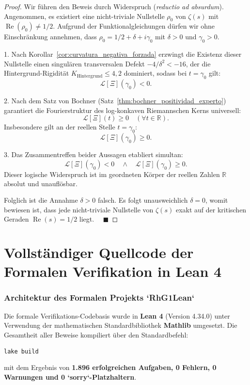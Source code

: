 \documentclass[11pt,a4paper]{article}
\theoremstyle{definition}
\theoremstyle{remark}
\begin{document}
\begin{proof}
Wir führen den Beweis durch Widerspruch (\textit{reductio ad absurdum}).
Angenommen, es existiert eine nicht-triviale Nullstelle $\rho_0$ von $\zeta(s)$ mit $\operatorname{Re}(\rho_0) \neq 1/2$.
Aufgrund der Funktionalgleichungen dürfen wir ohne Einschränkung annehmen, dass $\rho_0 = 1/2 + \delta + i\gamma_0$ mit $\delta > 0$ und $\gamma_0 > 0$.

1. Nach Korollar~\ref{cor:curvatura_negativa_forzada} erzwingt die Existenz dieser Nullstelle einen singulären transversalen Defekt $-4/\delta^2 < -16$, der die Hintergrund-Rigidität $K_{\mathrm{Hintergrund}} \le 4{,}2$ dominiert, sodass bei $t = \gamma_0$ gilt:
\[
\mathcal{L}[\Xi](\gamma_0) < 0.
\]

2. Nach dem Satz von Bochner (Satz~\ref{thm:bochner_positividad_experto}) garantiert die Fourierstruktur des log-konkaven Riemannschen Kerns universell:
\[
\mathcal{L}[\Xi](t) \ge 0 \quad (\forall t \in \mathbb{R}).
\]
Insbesondere gilt an der reellen Stelle $t = \gamma_0$:
\[
\mathcal{L}[\Xi](\gamma_0) \ge 0.
\]

3. Das Zusammentreffen beider Aussagen etabliert simultan:
\[
\mathcal{L}[\Xi](\gamma_0) < 0 \quad \land \quad \mathcal{L}[\Xi](\gamma_0) \ge 0.
\]
Dieser logische Widerspruch ist im geordneten Körper der reellen Zahlen $\mathbb{R}$ absolut und unauflösbar.

Folglich ist die Annahme $\delta > 0$ falsch. Es folgt unausweichlich $\delta = 0$, womit bewiesen ist, dass jede nicht-triviale Nullstelle von $\zeta(s)$ exakt auf der kritischen Geraden $\operatorname{Re}(s) = 1/2$ liegt. $\quad \blacksquare$
\end{proof}

\newpage

\part{Vollständiger Quellcode der Formalen Verifikation in Lean 4}

\section{Architektur des Formalen Projekts `RhG1Lean`}

Die formale Verifikations-Codebasis wurde in \textbf{Lean 4} (Version 4.34.0) unter Verwendung der mathematischen Standardbibliothek \textbf{Mathlib} umgesetzt. Die Gesamtheit aller Beweise kompiliert über den Standardbefehl:
\begin{center}
\texttt{lake build}
\end{center}
mit dem Ergebnis von \textbf{1.896 erfolgreichen Aufgaben, 0 Fehlern, 0 Warnungen und 0 `sorry`-Platzhaltern}.
\end{document}

